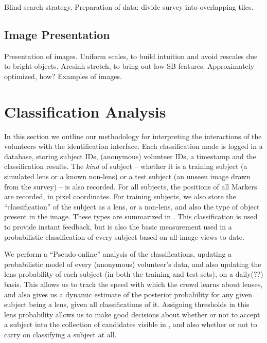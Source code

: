 \documentclass[useAMS,usenatbib,a4paper]{mn2e}
\begin{document}
Blind search strategy.
Preparation of data: divide survey into overlapping tiles. 



\subsection{Image Presentation}
\label{sec:data:display}

Presentation of images. Uniform scales, to build intuition and avoid rescales
due to bright objects. Arcsinh stretch, to bring out low SB features. 
Approximately optimized, how? Examples of images.



\section{Classification Analysis}
\label{sec:IDanalysis}

In this section we outline our methodology for interpreting the
interactions of the volunteers with the identification interface.  Each
classification made is logged in a database, storing subject IDs,
(anonymous) volunteer IDs, a timestamp and the classification results. 
The {\it kind} of subject -- whether it is a training subject (a 
simulated lens or a known non-lens) or a test subject (an unseen image
drawn from the survey) -- is also recorded. For all subjects, the
positions of all Markers are recorded, in pixel coordinates. For
training subjects, we also store the ``classification'' of the subject
as a lens, or a non-lens, and also the type of object present in the
image. These types are summarized in . 
This classification is used to provide instant feedback, but is also the
basic measurement used in a probabilistic classification of every
subject based on all image views to date.

We perform a ``Pseudo-online'' analysis of the classifications, 
updating a probabilistic model of every (anonymous) volunteer's
data, and also updating the lens probability of each subject 
(in both the training and test sets), on a
daily(??) basis. This allows us to track the speed with which the crowd
learns about lenses, and also gives us a dynamic estimate of the
posterior probability for  any given  subject being a lens, given all
classifications of it. Assigning thresholds in this lens probability
allows us to make good decisions about whether or not to accept a
subject into the collection of candidates visible in \Talk, and also
whether or not to  carry on classifying a subject at all. 
\end{document}

